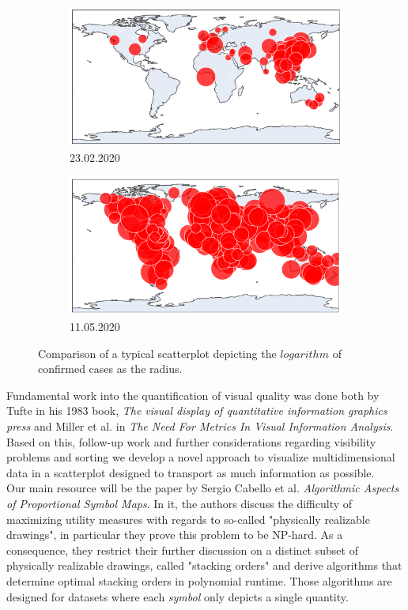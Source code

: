 \documentclass[a4paper,11pt]{article}
\begin{document}
%
\begin{figure}[h]
  \begin{subfigure}{0.5\textwidth}
    \includegraphics[width=0.9\linewidth]{covid_spread_20200223.png}
    \caption{23.02.2020}\label{fig:covid2020Feb}
  \end{subfigure}
  \begin{subfigure}{0.5\textwidth}
    \includegraphics[width=0.9\linewidth]{covid_spread_20200511.png}
    \caption{11.05.2020}\label{fig:covid2020May}
  \end{subfigure}
  \caption{Comparison of a typical scatterplot depicting the $logarithm$ of confirmed cases as the radius.}
  \label{fig:covid19}
\end{figure}
%

Fundamental work into the quantification of visual quality was done both by Tufte in his 1983 book, \textit{The visual display of quantitative information graphics press} and Miller et al. in \textit{The Need For Metrics In Visual Information Analysis}. Based on this, follow-up work and further considerations regarding visibility problems and sorting we develop a novel approach to visualize multidimensional data in a scatterplot designed to transport as much information as possible.\\

Our main resource will be the paper by Sergio Cabello et al. \textit{Algorithmic Aspects of Proportional Symbol Maps}. In it, the authors discuss the difficulty of maximizing utility measures with regards to so-called "physically realizable drawings", in particular they prove this problem to be NP-hard. As a consequence, they restrict their further discussion on a distinct subset of physically realizable drawings, called "stacking orders" and derive algorithms that determine optimal stacking orders in polynomial runtime. Those algorithms are designed for datasets where each \textit{symbol} only depicts a single quantity.\\
\end{document}
